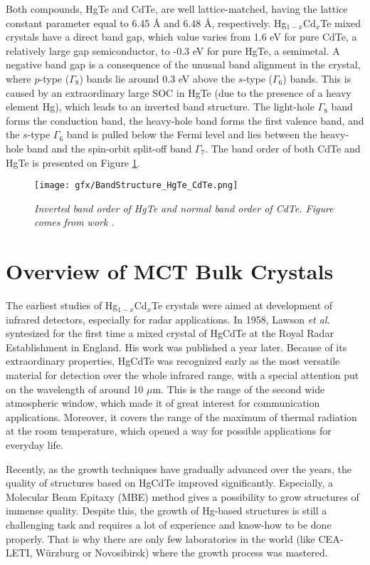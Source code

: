 \documentclass[titlepage,a4paper]{book}
\newcommand{\wciecie}{\quad\phantom{v}}
\begin{document}
Both compounds, HgTe and CdTe, are well lattice-matched, having the lattice constant parameter equal to 6.45 Å and 6.48 Å, respectively. Hg$_{1-x}$Cd$_x$Te mixed crystals have a direct band gap, which value varies from 1.6 eV for pure CdTe, a relatively large gap semiconductor, to -0.3 eV for pure HgTe, a semimetal. A negative band gap is a consequence of the unusual band alignment in the crystal, where $p$-type ($\Gamma_8$) bands lie around 0.3 eV above the $s$-type ($\Gamma_6$) bands. This is caused by an extraordinary large SOC in HgTe (due to the presence of a heavy element Hg), which leads to an inverted band structure. The light-hole $\Gamma_8$ band forms the conduction band, the heavy-hole band forms the first valence band, and the $s$-type $\Gamma_6$ band is pulled below the Fermi level and lies between the heavy-hole band and the spin-orbit split-off band $\Gamma_7$. The band order of both CdTe and HgTe is presented on Figure \ref{fig:BandStructure_HgTe_CdTe}.

\begin{figure}[ht]
	\centering
	\texttt{[image: gfx/BandStructure\_HgTe\_CdTe.png]}
	\vspace{-10pt}
	\caption{\textit{Inverted band order of HgTe and normal band order of CdTe. Figure comes from work \cite{Bernevig_Topology2}.}}
	\label{fig:BandStructure_HgTe_CdTe}
\end{figure} 

\clearpage
\section{Overview of MCT Bulk Crystals}
\wciecie
The earliest studies of Hg$_{1-x}$Cd$_x$Te crystals were aimed at development of infrared detectors, especially for radar applications. In 1958, Lawson \textit{et al.} syntesized for the first time a mixed crystal of HgCdTe at the Royal Radar Establishment in England. His work was published \cite{Lawson_MCT} a year later. Because of its extraordinary properties, HgCdTe was recognized early as the most versatile material for detection over the whole infrared range, with a special attention put on the wavelength of around 10 $\mu$m. This is the range of the second wide atmospheric window, which made it of great interest for communication applications. Moreover, it covers the range of the maximum of thermal radiation at the room temperature, which opened a way for possible applications for everyday life. 

Recently, as the growth techniques have gradually advanced over the years, the quality of structures based on HgCdTe improved significantly. Especially, a Molecular Beam Epitaxy (MBE) method gives a possibility to grow structures of immense quality. Despite this, the growth of Hg-based structures is still a challenging task and requires a lot of experience and know-how to be done properly. That is why there are only few laboratories in the world (like CEA-LETI, Würzburg or Novosibirsk) where the growth process was mastered.
\end{document}
